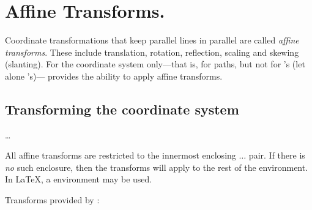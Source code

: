 \documentclass[letterpaper]{article}
\begin{document}
\section{Affine Transforms.}\label{transforms}

Coordinate transformations that keep parallel lines in parallel are
called \emph{affine transforms}.  These include translation, rotation,
reflection, scaling and skewing (slanting). For the \MF{} coordinate
system only---that is, for paths, but not for 's (let alone
's)---\mfp{} provides the ability to apply \MF{}
affine transforms.


\subsection{Transforming the \MF{} coordinate system}\label{affine}

\begin{cd}
 \dots {}%
%
\end{cd}

All affine transforms are restricted to the innermost enclosing
$\ldots$ pair.  If there is \emph{no} such
enclosure, then the transforms will apply to the rest of the 
environment. In \LaTeX{}, a  environment may be used.

\medskip
\noindent Transforms provided by \mfp{}:
\end{document}

